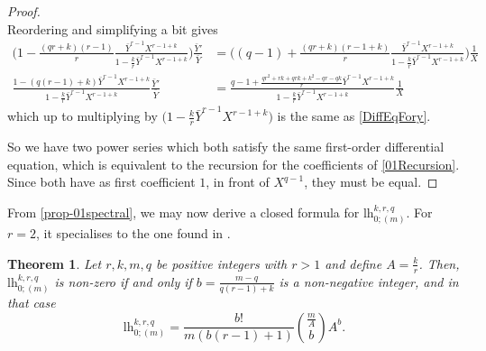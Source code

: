 \documentclass[10pt,a4paper,oneside,no-math,reqno]{amsart}%
\theoremstyle{plain}
\newtheorem{theorem}{Theorem}[section]
\theoremstyle{definition}
\theoremstyle{remark}
\numberwithin{equation}{section}
\newcommand{\1}{\mathds{1}}
\newcommand{\<}{\langle}
\renewcommand{\>}{\rangle}
\newcommand{\lh}{\mathord{\mathrm{l\!h}}}
\begin{document}
\begin{proof}
\begin{equation}
	\end{equation}
	Reordering and simplifying a bit gives
	\begin{align}
		\Big( 1 - \frac{(qr+k)(r-1)}{r} \frac{\bar{Y}^{r-1} X^{r-1+k} }{ 1 - \frac{k}{r} \bar{Y}^{r-1} X^{r-1+k} } \Big) \frac{\bar{Y}'}{\bar{Y}} 
		&=
		\Big( (q-1) + \frac{(qr+k)(r-1+k)}{r} \frac{\bar{Y}^{r-1} X^{r-1+k} }{ 1 - \frac{k}{r} \bar{Y}^{r-1} X^{r-1+k} } \Big) \frac{1}{X}
		\\
		\frac{ 1 -(q(r-1) +k ) \bar{Y}^{r-1} X^{r-1+k} }{ 1 - \frac{k}{r} \bar{Y}^{r-1} X^{r-1+k} } \frac{\bar{Y}'}{\bar{Y}} 
		&=
		\frac{ q-1 + \frac{qr^2+rk + qrk + k^2 -qr - qk}{r} \bar{Y}^{r-1} X^{r-1+k} }{ 1 - \frac{k}{r} \bar{Y}^{r-1} X^{r-1+k} } \frac{1}{X}
	\end{align}
	which up to multiplying by $ \big( 1 - \frac{k}{r} \bar{Y}^{r-1} X^{r-1+k} \big) $ is the same as \eqref{DiffEqFory}.\par
	So we have two power series which both satisfy the same first-order differential equation, which is equivalent to the recursion for the coefficients of \cref{01Recursion}. Since both have as first coefficient $ 1$, in front of $X^{q-1}$, they must be equal.
\end{proof}

From \cref{prop-01spectral}, we may now derive a closed formula for $\lh^{k,r,q}_{0;(m)}$. For $r=2$, it specialises to the one found in \cite[Theorem 1]{CMS25}.

\begin{theorem}
    Let $r,k,m,q$ be positive integers with $r>1$ and define $A=\frac{k}{r}$. Then, $ \lh^{k,r,q}_{0;(m)} $ is non-zero if and only if $b = \frac{m-q}{q(r-1)+k}$ is a non-negative integer, and in that case
    \begin{equation}
        \lh^{k,r,q}_{0;(m)}
        =
        \frac{b!}{m(b(r-1)+1)}\binom{\frac{m}{A}}{b}A^b.
    \end{equation}
\end{theorem}
\end{document}
